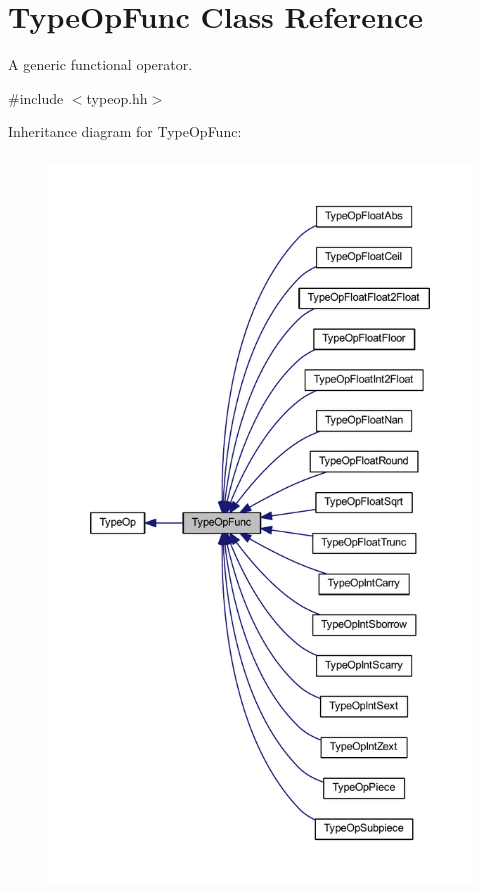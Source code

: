 \hypertarget{class_type_op_func}{}\section{Type\+Op\+Func Class Reference}
\label{class_type_op_func}


A generic functional operator.  




{\ttfamily \#include $<$typeop.\+hh$>$}



Inheritance diagram for Type\+Op\+Func\+:
\nopagebreak
\begin{figure}[H]
\begin{center}
\leavevmode
\includegraphics[height=550pt]{class_type_op_func__inherit__graph}
\end{center}
\end{figure}


